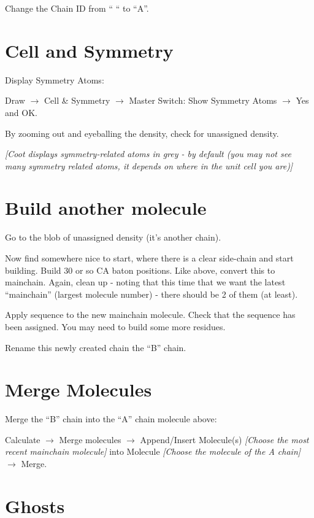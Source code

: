 \documentclass{article}
\begin{document}
Change the Chain ID from `` `` to ``A''.

\section{Cell and Symmetry}

Display Symmetry Atoms:

\textsf{Draw $\rightarrow$ Cell \& Symmetry $\rightarrow$ Master
  Switch: Show Symmetry Atoms $\rightarrow$ Yes} and \textsf{OK}.

By zooming out and eyeballing the density, check for unassigned density.

\textsl{ [Coot displays symmetry-related atoms in grey - by default
  (you may not see many symmetry related atoms, it depends on where in
  the unit cell you are)]}


\section{Build another molecule}

Go to the blob of unassigned density (it's another chain).

Now find somewhere nice to start, where there is a clear side-chain
and start building.  Build 30 or so CA baton positions.  Like above,
convert this to mainchain.  Again, clean up - noting that this time
that we want the latest ``mainchain'' (largest molecule number) -
there should be 2 of them (at least).

Apply sequence to the new mainchain molecule.  Check that the sequence
has been assigned.  You may need to build some more residues.

Rename this newly created chain the ``B'' chain.

\section{Merge Molecules}

Merge the ``B'' chain into the ``A'' chain molecule above: 

\textsf{Calculate $\rightarrow$ Merge molecules $\rightarrow$
  Append/Insert Molecule(s) \emph{[Choose the most recent mainchain
    molecule]} into Molecule \emph{[Choose the molecule of the A chain]}
  $\rightarrow$ Merge}.

\section{Ghosts}
\end{document}
